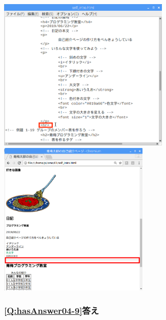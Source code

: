 \documentclass[a4paper,12pt]{jarticle}
\begin{document}
\centering
\includegraphics[width=8.186cm,height=7.304cm]{textbook-img237.png}
\includegraphics[width=7.163cm,height=7.373cm]{textbook-img238.png}
\flushleft

\bigskip


\bigskip

\clearpage\subsubsection{\bfseries
\ref*{Q:hasAnswer04-9}答え}



\centering
{}
\flushleft

\bigskip

\centering
{}
\flushleft
\end{document}
